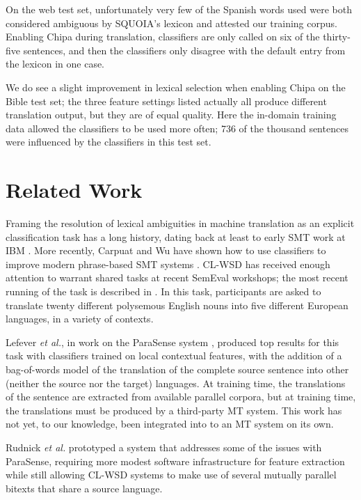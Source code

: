 \documentclass[10pt, a4paper]{article}
\begin{document}
On the web test set, unfortunately very few of the Spanish words used were both
considered ambiguous by SQUOIA's lexicon and attested our training corpus.
Enabling Chipa during translation, classifiers are only called on six of the
thirty-five sentences, and then the classifiers only disagree with the default
entry from the lexicon in one case.

We do see a slight improvement in lexical selection when enabling Chipa on the
Bible test set; the three feature settings listed actually all produce
different translation output, but they are of equal quality. Here the in-domain
training data allowed the classifiers to be used more often; 736 of the
thousand sentences were influenced by the classifiers in this test set.

\section{Related Work}
Framing the resolution of lexical ambiguities in machine translation
as an explicit classification
task has a long history, dating back at least to early SMT work at IBM
\cite{Brown91word-sensedisambiguation}.  More recently, Carpuat and Wu have
shown how to use classifiers to improve modern phrase-based SMT systems
\cite{carpuatpsd}.
CL-WSD has received enough attention to warrant shared tasks at recent SemEval
workshops; the most recent running of the task is described in \cite{task10}.
In this task, participants are asked to translate twenty different polysemous
English nouns into five different European languages, in a variety of contexts.

Lefever \emph{et al.}, in work on the ParaSense system
, produced top results for
this task with classifiers trained on local contextual features, with the 
addition of a bag-of-words model of the translation of the complete source
sentence into other (neither the source nor the target) languages. At training
time, the translations of the sentence are extracted from available parallel
corpora, but at training time, the translations must be produced by a
third-party MT system.
This work has not yet, to our knowledge, been integrated into to an MT system
on its own.

Rudnick \emph{et al.} 
prototyped a system that addresses some of the issues with ParaSense, requiring
more modest software infrastructure for feature extraction while still allowing
CL-WSD systems to make use of several mutually parallel bitexts that share a
source language.
\end{document}
